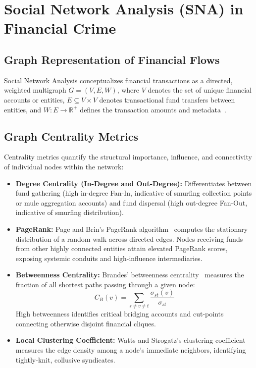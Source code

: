 \section{Social Network Analysis (SNA) in Financial Crime}
\subsection{Graph Representation of Financial Flows}
Social Network Analysis conceptualizes financial transactions as a directed, weighted multigraph $G = (V, E, W)$, where $V$ denotes the set of unique financial accounts or entities, $E \subseteq V \times V$ denotes transactional fund transfers between entities, and $W: E \rightarrow \mathbb{R}^+$ defines the transaction amounts and metadata~\cite{borgatti2024analyzing, sousa2022identifying}.

\subsection{Graph Centrality Metrics}
Centrality metrics quantify the structural importance, influence, and connectivity of individual nodes within the network:
\begin{itemize}
    \item \textbf{Degree Centrality (In-Degree and Out-Degree):} Differentiates between fund gathering (high in-degree Fan-In, indicative of smurfing collection points or mule aggregation accounts) and fund dispersal (high out-degree Fan-Out, indicative of smurfing distribution).
    \item \textbf{PageRank:} Page and Brin's PageRank algorithm~\cite{page1999pagerank} computes the stationary distribution of a random walk across directed edges. Nodes receiving funds from other highly connected entities attain elevated PageRank scores, exposing systemic conduits and high-influence intermediaries.
    \item \textbf{Betweenness Centrality:} Brandes' betweenness centrality~\cite{brandes2001faster} measures the fraction of all shortest paths passing through a given node:
    \begin{equation}
        C_B(v) = \sum_{s \neq v \neq t} \frac{\sigma_{st}(v)}{\sigma_{st}}
    \end{equation}
    High betweenness identifies critical bridging accounts and cut-points connecting otherwise disjoint financial cliques.
    \item \textbf{Local Clustering Coefficient:} Watts and Strogatz's clustering coefficient~\cite{watts1998collective} measures the edge density among a node's immediate neighbors, identifying tightly-knit, collusive syndicates.
\end{itemize}

